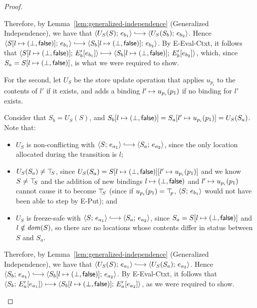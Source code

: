 \begin{proof}
\begin{enumerate}
\begin{enumerate}
      Therefore, by Lemma~\ref{lem:generalized-independence}
      (Generalized Independence), we have that
      $\config{U_S(S)}{e_{b_1}} \parstepsto
      \config{U_S(S_b)}{e_{b_2}}$.  Hence
      $\config{\extS{S}{l}{\bot}{\frozenfalse}}{e_{b_1}} \parstepsto
      \config{\extS{S_b}{l}{\bot}{\frozenfalse}}{e_{b_2}}$.  By {\sc
        E-Eval-Ctxt}, it follows that
      $\langle S[l \mapsto (\bot, \textsf{false})];\, E'_b\hspace{-0.5mm}\left[e_{b_1}\right] \rangle
      \longmapsto
      \langle S_b[l \mapsto (\bot, \textsf{false})];\, E'_b\hspace{-0.5mm}\left[e_{b_2}\right] \rangle$,
      which, since $S_a = S[l \mapsto (\bot, \textsf{false})]$, is what we
      were required to show.

      For the second, let $U_S$ be the store update operation that
      applies $u_{p_i}$ to the contents of $l'$ if it exists, and adds
      a binding $l' \mapsto u_{p_i}(p_1)$ if no binding for
      $l'$ exists.

      Consider that $S_b = U_S(S)$, and
      $S_b[l \mapsto (\bot, \textsf{false})] =
      S_a[l' \mapsto u_{p_i}(p_1)] = U_S(S_a)$.  Note that:
      \begin{itemize}
      \item $U_S$ is non-conflicting with $\config{S}{e_{a_1}}
        \parstepsto \config{S_a}{e_{a_2}}$, since the only location
        allocated during the transition is $l$;
      \item $U_S(S_a) \neq \top\hspace{-0.85mm}_{S}$, since $U_S(S_a) =
        S[l \mapsto (\bot, \textsf{false})][l' \mapsto u_{p_i}(p_1)]$
        and we know $S \neq \top\hspace{-0.85mm}_{S}$ and the addition of new bindings
        $l \mapsto (\bot, \textsf{false})$ and
        $l' \mapsto u_{p_i}(p_1)$ cannot cause it to become
        $\top\hspace{-0.85mm}_{S}$ (since if $u_{p_i}(p_1) = \top\hspace{-0.85mm}_{p}$,
        $\langle S;\, e_{b_1} \rangle$ would not have been able to step by {\sc
          E-Put}); and
      \item $U_S$ is freeze-safe with $\config{S}{e_{a_1}} \parstepsto
        \config{S_a}{e_{a_2}}$, since $S_a =
        S[l \mapsto (\bot, \textsf{false})]$ and $l \notin \mathit{dom}(S)$, so
        there are no locations whose contents differ in status between
        $S$ and $S_a$.
      \end{itemize}

      Therefore, by Lemma~\ref{lem:generalized-independence}
      (Generalized Independence), we have that
      $\config{U_S(S)}{e_{a_1}} \parstepsto
      \config{U_S(S_a)}{e_{a_2}}$.  Hence $\config{S_b}{e_{a_1}}
      \parstepsto
      \config{\extS{S_b}{l}{\bot}{\frozenfalse}}{e_{a_2}}$.  By {\sc
        E-Eval-Ctxt}, it follows that
      $\langle S_b;\, E'_a\hspace{-0.5mm}\left[e_{a_1}\right] \rangle \longmapsto
      \langle S_b[l \mapsto (\bot, \textsf{false})];\, E'_a\hspace{-0.5mm}\left[e_{a_2}\right] \rangle$,
      as we were required to show.


\end{enumerate}
\end{enumerate}
\end{proof}
